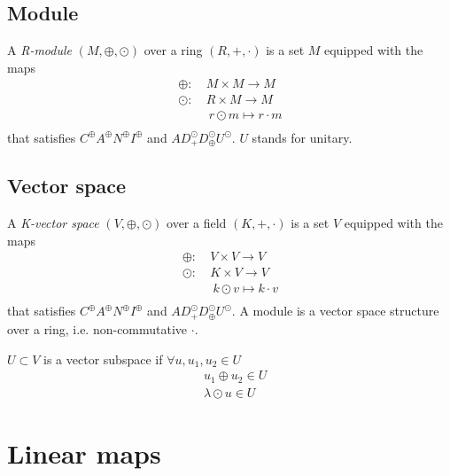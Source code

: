 \documentclass[root.tex]{subfiles}
\begin{document}
\section{Module}
\begin{mydef}
  A \emph{R-module} $(M, \oplus, \odot )$ over a ring $(R, +, \cdot)$ is a set $M$ equipped with the maps
  \begin{align*}
    \oplus      :\ &M \times M \rightarrow M\\
    \odot       :\ &R \times M \rightarrow M\\
                &\ r \odot m \mapsto r\cdot m\\
  \end{align*}
  that satisfies $C^{\oplus}A^{\oplus}N^{\oplus}I^{\oplus}$ and $AD^{\odot}_+D^\odot_{\oplus}U^{\odot}$. $U$ stands for unitary.
\end{mydef}
\section{Vector space}
\begin{mydef}
  A \emph{K-vector space} $(V, \oplus, \odot )$ over a field $(K,+,\cdot)$ is a set $V$ equipped with the maps
  \begin{align*}
    \oplus  :\ &V \times V \rightarrow V\\
    \odot   :\ &K \times V \rightarrow V\\
            &\ k \odot v \mapsto k\cdot v\\
  \end{align*}
  that satisfies $C^{\oplus}A^{\oplus}N^{\oplus}I^{\oplus}$ and $AD^{\odot}_+D^\odot_{\oplus}U^{\odot}$. A module is a vector space structure over a ring, i.e. non-commutative $\cdot$.
\end{mydef}
\begin{mydef}
  $U \subset V$ is a vector subspace if $\forall u, u_1, u_2 \in U$  
  \begin{align*}
    &u_1 \oplus u_2 \in U\\
    &\lambda \odot u \in U
  \end{align*}
\end{mydef}


\chapter{Linear maps}%
\end{document}
